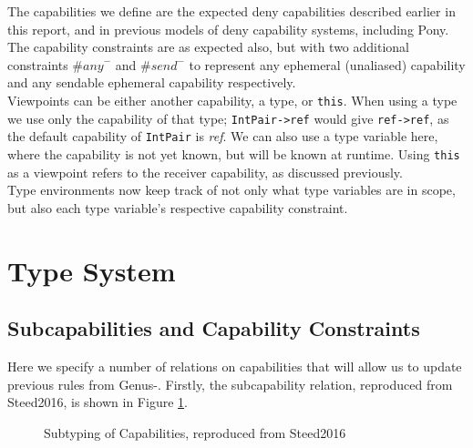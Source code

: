 The capabilities we define are the expected deny capabilities described earlier in this report, and in previous models of deny capability systems, including Pony. The capability constraints are as expected also, but with two additional constraints $\textit{\#any}^-$ and $\textit{\#send}^-$ to represent any ephemeral (unaliased) capability and any sendable ephemeral capability respectively. \\

Viewpoints can be either another capability, a type, or \texttt{this}. When using a type we use only the capability of that type; \texttt{IntPair->ref} would give \texttt{ref->ref}, as the default capability of \texttt{IntPair} is \textit{ref}. We can also use a type variable here, where the capability is not yet known, but will be known at runtime. Using \texttt{this} as a viewpoint refers to the receiver capability, as discussed previously. \\

Type environments now keep track of not only what type variables are in scope, but also each type variable's respective capability constraint.

\newpage

\section{Type System}

\subsection{Subcapabilities and Capability Constraints}

Here we specify a number of relations on capabilities that will allow us to update previous rules from Genus-. Firstly, the subcapability relation, reproduced from Steed2016, is shown in Figure \ref{fig:degen-subcap}.

\begin{figure}[H]
    \centering
    \caption{Subtyping of Capabilities, reproduced from Steed2016}
    \label{fig:degen-subcap}
\end{figure}

